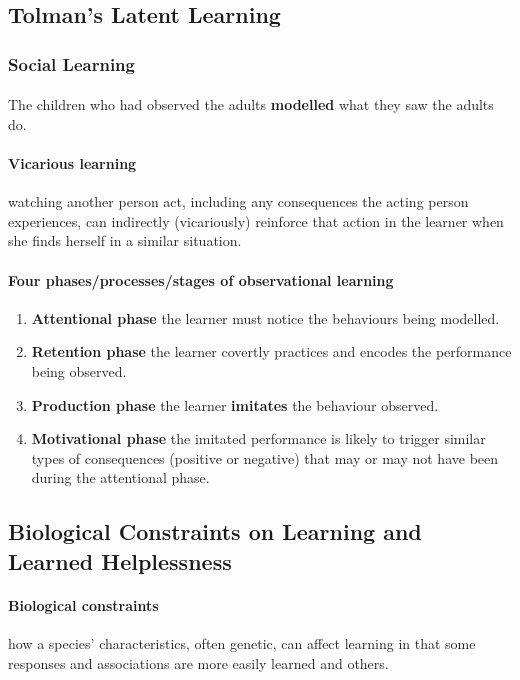 \documentclass{article}
\begin{document}
	\subsection{Tolman's Latent Learning}
	\subsubsection{Social Learning}
	\paragraph{} The children who had observed the adults \textbf{modelled} what they saw the adults do.
	\paragraph{Vicarious learning} watching another person act, including any consequences the acting person experiences, can indirectly (vicariously) reinforce that action in the learner when she finds herself in a similar situation.
	\paragraph{Four phases/processes/stages of observational learning}
	\begin{enumerate}
		\item \textbf{Attentional phase} the learner must notice the behaviours being modelled.
		\item \textbf{Retention phase} the learner covertly practices and encodes the performance being observed.
		\item \textbf{Production phase} the learner \textbf{imitates} the behaviour observed.
		\item \textbf{Motivational phase} the imitated performance is likely to trigger similar types of consequences (positive or negative) that may or may not have been during the attentional phase.
	\end{enumerate}
	\subsection{Biological Constraints on Learning and Learned Helplessness}
	\paragraph{Biological constraints} how a species' characteristics, often genetic, can affect learning in that some responses and associations are more easily learned and others.
\end{document}
